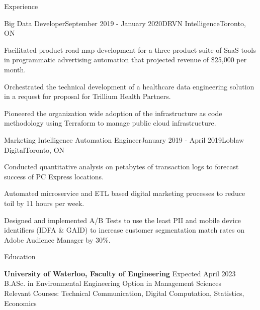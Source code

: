 \documentclass{resume} %
\begin{document}
\begin{rSection}{Experience}
\begin{rSubsection}{Big Data Developer}{September 2019 - January 2020}{DRVN Intelligence}{Toronto, ON}
\item Facilitated product road-map development for a three product suite of SaaS tools in programmatic advertising automation that projected revenue of \$25,000 per month.
\item Orchestrated the technical development of a healthcare data engineering solution in a request for proposal for Trillium Health Partners.
\item Pioneered the organization wide adoption of the infrastructure as code methodology using Terraform to manage public cloud infrastructure. 
\end{rSubsection}


\begin{rSubsection}{Marketing Intelligence Automation Engineer}{January 2019 - April 2019}{Loblaw Digital}{Toronto, ON}
\item Conducted quantitative analysis on petabytes of transaction logs to forecast success of PC Express locations.
\item Automated microservice and ETL based digital marketing processes  to reduce toil by 11 hours per week.
\item Designed and implemented A/B Tests to use the least PII and mobile device identifiers (IDFA \& GAID) to increase customer segmentation match rates on Adobe Audience Manager by 30\%. 
\end{rSubsection}

\end{rSection}

\begin{rSection}{Education}

{\bf University of Waterloo, Faculty of Engineering} \hfill { Expected April 2023} \\ 
B.ASc. in Environmental Engineering Option in Management Sciences \\
Relevant Courses: Technical Communication, Digital Computation, Statistics, Economics

\end{rSection}

\end{document}
